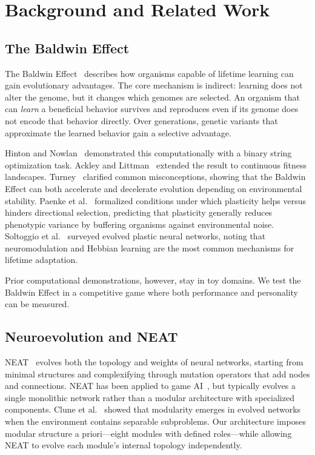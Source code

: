 \documentclass[11pt,a4paper]{article}
\begin{document}
\section{Background and Related Work}

\subsection{The Baldwin Effect}

The Baldwin Effect~\citep{baldwin1896} describes how organisms capable of lifetime learning can gain evolutionary advantages.
The core mechanism is indirect: learning does not alter the genome, but it changes which genomes are selected.
An organism that can \emph{learn} a beneficial behavior survives and reproduces even if its genome does not encode that behavior directly.
Over generations, genetic variants that approximate the learned behavior gain a selective advantage.

Hinton and Nowlan~\citep{hinton1987} demonstrated this computationally with a binary string optimization task.
Ackley and Littman~\citep{ackley1991} extended the result to continuous fitness landscapes.
Turney~\citep{turney1996baldwin} clarified common misconceptions, showing that the Baldwin Effect can both accelerate and decelerate evolution depending on environmental stability.
Paenke et al.~\citep{paenke2009baldwin} formalized conditions under which plasticity helps versus hinders directional selection, predicting that plasticity generally reduces phenotypic variance by buffering organisms against environmental noise.
Soltoggio et al.~\citep{soltoggio2018neuromodulation} surveyed evolved plastic neural networks, noting that neuromodulation and Hebbian learning are the most common mechanisms for lifetime adaptation.

Prior computational demonstrations, however, stay in toy domains.
We test the Baldwin Effect in a competitive game where both performance and personality can be measured.

\subsection{Neuroevolution and NEAT}

NEAT~\citep{stanley2002neat} evolves both the topology and weights of neural networks, starting from minimal structures and complexifying through mutation operators that add nodes and connections.
NEAT has been applied to game AI~\citep{stanley2005rtNEAT, risi2017neuroevolution}, but typically evolves a single monolithic network rather than a modular architecture with specialized components.
Clune et al.~\citep{clune2013modularity} showed that modularity emerges in evolved networks when the environment contains separable subproblems.
Our architecture imposes modular structure a priori---eight modules with defined roles---while allowing NEAT to evolve each module's internal topology independently.
\end{document}
